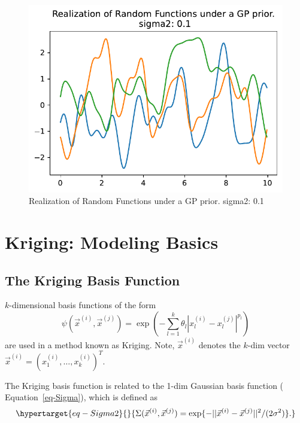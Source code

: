 \documentclass[
  letterpaper,
  DIV=11,
  numbers=noendperiod]{scrreprt}
\begin{document}
\begin{figure}[H]

{\centering \includegraphics{006_num_gp_files/figure-pdf/fig-mvn05-output-1.pdf}

}

\caption{\label{fig-mvn05}Realization of Random Functions under a GP
prior. sigma2: 0.1}

\end{figure}

\hypertarget{kriging-modeling-basics}{%
\section{Kriging: Modeling Basics}\label{kriging-modeling-basics}}

\hypertarget{the-kriging-basis-function}{%
\subsection{The Kriging Basis
Function}\label{the-kriging-basis-function}}

\(k\)-dimensional basis functions of the form \[
\psi(\vec{x}^{(i)}, \vec{x}^{(j)}) = \exp \left( - \sum_{l=1}^k \theta_l | x_{l}^{(i)} - x_{l}^{(j)} | ^{p_l} \right)
\] are used in a method known as Kriging. Note, \(\vec{x}^{(i)}\)
denotes the \(k\)-dim vector
\(\vec{x}^{(i)}= (x_1^{(i)}, \ldots, x_k^{(i)})^T\).

The Kriging basis function is related to the 1-dim Gaussian basis
function ( Equation~\ref{eq-Sigma}), which is defined as
\begin{equation}\protect\hypertarget{eq-Sigma2}{}{
\Sigma(\vec{x}^{(i)}, \vec{x}^{(j)}) = \exp\{ - || \vec{x}^{(i)} - \vec{x}^{(j)}||^2 / (2\sigma^2) \}.
}\label{eq-Sigma2}\end{equation}
\end{document}
